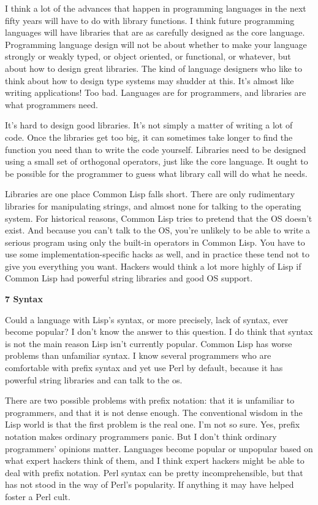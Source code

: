 I think a lot of the advances that happen in programming languages in
the next fifty years will have to do with library functions. I think
future programming languages will have libraries that are as carefully
designed as the core language. Programming language design will not be
about whether to make your language strongly or weakly typed, or object
oriented, or functional, or whatever, but about how to design great
libraries. The kind of language designers who like to think about how to
design type systems may shudder at this. It's almost like writing
applications! Too bad. Languages are for programmers, and libraries are
what programmers need.

It's hard to design good libraries. It's not simply a matter of writing
a lot of code. Once the libraries get too big, it can sometimes take
longer to find the function you need than to write the code yourself.
Libraries need to be designed using a small set of orthogonal operators,
just like the core language. It ought to be possible for the programmer
to guess what library call will do what he needs.

Libraries are one place Common Lisp falls short. There are only
rudimentary libraries for manipulating strings, and almost none for
talking to the operating system. For historical reasons, Common Lisp
tries to pretend that the OS doesn't exist. And because you can't talk
to the OS, you're unlikely to be able to write a serious program using
only the built-in operators in Common Lisp. You have to use some
implementation-specific hacks as well, and in practice these tend not to
give you everything you want. Hackers would think a lot more highly of
Lisp if Common Lisp had powerful string libraries and good OS support.

\textbf{7 Syntax}

Could a language with Lisp's syntax, or more precisely, lack of syntax,
ever become popular? I don't know the answer to this question. I do
think that syntax is not the main reason Lisp isn't currently popular.
Common Lisp has worse problems than unfamiliar syntax. I know several
programmers who are comfortable with prefix syntax and yet use Perl by
default, because it has powerful string libraries and can talk to the
os.

There are two possible problems with prefix notation: that it is
unfamiliar to programmers, and that it is not dense enough. The
conventional wisdom in the Lisp world is that the first problem is the
real one. I'm not so sure. Yes, prefix notation makes ordinary
programmers panic. But I don't think ordinary programmers' opinions
matter. Languages become popular or unpopular based on what expert
hackers think of them, and I think expert hackers might be able to deal
with prefix notation. Perl syntax can be pretty incomprehensible, but
that has not stood in the way of Perl's popularity. If anything it may
have helped foster a Perl cult.


